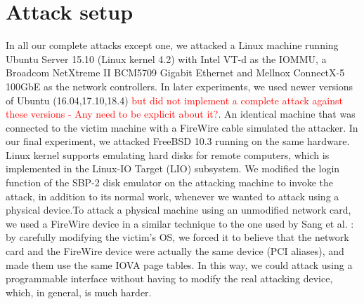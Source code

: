 \section{Attack setup}
In all our complete attacks except one, we attacked a Linux machine running Ubuntu Server 15.10 (Linux kernel 4.2) with Intel VT-d as the IOMMU, a Broadcom NetXtreme II BCM5709 Gigabit Ethernet and Mellnox ConnectX-5 100GbE as the network controllers. In later experiments, we used newer versions of Ubuntu (16.04,17.10,18.4) \textcolor{red}{but did not implement a complete attack against these versions - Any need to be explicit about it?}. An identical machine that was connected to the victim machine with a FireWire cable simulated the attacker. In our final experiment, we attacked FreeBSD 10.3 running on the same hardware.  Linux kernel supports emulating hard disks for remote computers, which is implemented in the Linux-IO Target (LIO) subsystem. We modified the login function of the SBP-2 disk emulator on the attacking machine to invoke the attack, in addition to its normal work, whenever we wanted to attack using a physical device.To attack a physical machine using an unmodified network card, we used a FireWire device in a similar technique to the one used by Sang et al. \cite{SLND10}: by carefully modifying the victim’s OS, we forced it to believe that the network card and the FireWire device were actually the same device (PCI aliases), and made them use the same IOVA page tables. In this way, we could attack using a programmable interface without having to modify the real attacking device, which, in general, is much harder.
